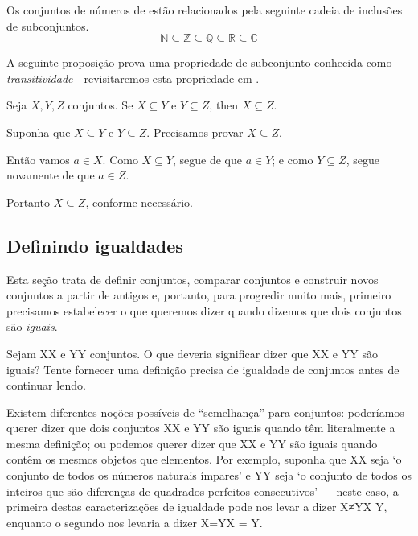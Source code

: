 \begin{example}
Os conjuntos de números de  estão relacionados pela seguinte cadeia de inclusões de subconjuntos.
\[ \mathbb{N} \subseteq \mathbb{Z} \subseteq \mathbb{Q} \subseteq \mathbb{R} \subseteq \mathbb{C} \]
\end{example}

A seguinte proposição prova uma propriedade de subconjunto conhecida como \textit{transitividade}---revisitaremos esta propriedade em .

\begin{proposition}
\label{propSubsetTransitive}
Seja $X,Y,Z$ conjuntos. Se $X \subseteq Y$ e $Y \subseteq Z$, then $X \subseteq Z$.
\end{proposition}

\begin{cproof}
Suponha que $X \subseteq Y$ e $Y \subseteq Z$. Precisamos provar $X \subseteq Z$.

Então vamos $a \in X$. Como $X \subseteq Y$, segue de  que $a \in Y$; e como $Y \subseteq Z$, segue novamente de  que $a \in Z$.

Portanto $X \subseteq Z$, conforme necessário.
\end{cproof}

\subsection*{Definindo igualdades}

Esta seção trata de definir conjuntos, comparar conjuntos e construir novos conjuntos a partir de antigos e, portanto, para progredir muito mais, primeiro precisamos estabelecer o que queremos dizer quando dizemos que dois conjuntos são \textit{iguais}.

\begin{discussion}
\label{dscSetEquality}
Sejam XX e YY conjuntos. O que deveria significar dizer que XX e YY são iguais? Tente fornecer uma definição precisa de igualdade de conjuntos antes de continuar lendo.
\end{discussion}

Existem diferentes noções possíveis de “semelhança” para conjuntos: poderíamos querer dizer que dois conjuntos XX e YY são iguais quando têm literalmente a mesma definição; ou podemos querer dizer que XX e YY são iguais quando contêm os mesmos objetos que elementos. Por exemplo, suponha que XX seja `o conjunto de todos os números naturais ímpares' e YY seja `o conjunto de todos os inteiros que são diferenças de quadrados perfeitos consecutivos' --- neste caso, a primeira destas caracterizações de igualdade pode nos levar a dizer X≠YX \ne Y, enquanto o segundo nos levaria a dizer X=YX = Y.

